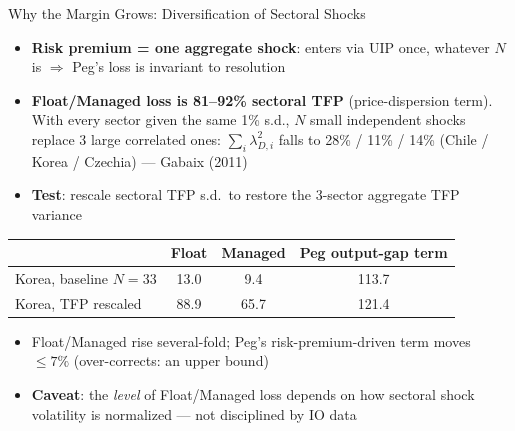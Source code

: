 \documentclass[aspectratio=43, 10pt]{beamer}
\begin{document}
\begin{frame}{Why the Margin Grows: Diversification of Sectoral Shocks}

{\footnotesize
\begin{itemize}\setlength{\itemsep}{4pt}
\item \textbf{Risk premium = one aggregate shock}: enters via UIP once, whatever $N$ is $\Rightarrow$ Peg's loss is invariant to resolution
\item \textbf{Float/Managed loss is 81--92\% sectoral TFP} (price-dispersion term). With every sector given the same 1\% s.d., $N$ small independent shocks replace 3 large correlated ones: $\sum_i\lambda_{D,i}^2$ falls to 28\% / 11\% / 14\% (Chile / Korea / Czechia) --- Gabaix (2011)
\item \textbf{Test}: rescale sectoral TFP s.d.\ to restore the 3-sector aggregate TFP variance
\end{itemize}

\vspace{4pt}
\begin{center}
\begin{tabular}{lccc}
\toprule
 & Float & Managed & Peg output-gap term \\
\midrule
Korea, baseline $N=33$ & 13.0 & 9.4 & 113.7 \\
Korea, TFP rescaled    & 88.9 & 65.7 & 121.4 \\
\bottomrule
\end{tabular}
\end{center}

\begin{itemize}\setlength{\itemsep}{3pt}
\item Float/Managed rise several-fold; Peg's risk-premium-driven term moves $\le7\%$ (over-corrects: an upper bound)
\item \textbf{Caveat}: the \emph{level} of Float/Managed loss depends on how sectoral shock volatility is normalized --- not disciplined by IO data
\end{itemize}}

\end{frame}
\end{document}
